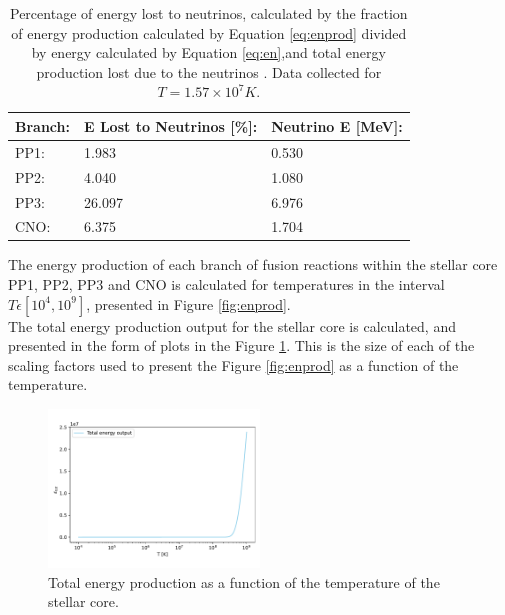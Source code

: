 \documentclass[10pt, nofootinbib, twocolumn]{revtex4-1}
\begin{document}
\begin{table}[H]
\caption{Percentage of energy lost to neutrinos, calculated by the fraction of energy production calculated by Equation \eqref{eq:enprod} divided by energy calculated by Equation \eqref{eq:en},and total energy production lost due to the neutrinos . Data collected for $T=1.57\times10^7K$.}
    \begin{tabular*}{0.5\textwidth}{@{\extracolsep{\fill}}lll}
    \textbf{Branch:}   & \textbf{E Lost to Neutrinos [\%]:} & \textbf{Neutrino E [MeV]:} \\
    \midrule
    PP1: & 1.983 & 0.530 \\
    PP2: & 4.040 & 1.080 \\
    PP3: & 26.097& 6.976 \\
    CNO: & 6.375 & 1.704 \\
    \end{tabular*}
    \label{tab:neu}
\end{table}

The energy production of each branch of fusion reactions within the stellar core PP1, PP2, PP3 and CNO is calculated for temperatures in the interval $T\epsilon [10^4,10^9]$, presented in Figure \ref{fig:enprod}. \\

The total energy production output for the stellar core is calculated, and presented in the form of plots in the Figure \ref{fig:tot}. This is the size of each of the scaling factors used to present the Figure \ref{fig:enprod} as a function of the temperature.
\begin{figure}[H]
    \centering
    \includegraphics[width = 0.5\textwidth]{figures/energy_tot.pdf} 
    \caption{Total energy production as a function of the temperature of the stellar core.}
    \label{fig:tot}
\end{figure} 
\end{document}
